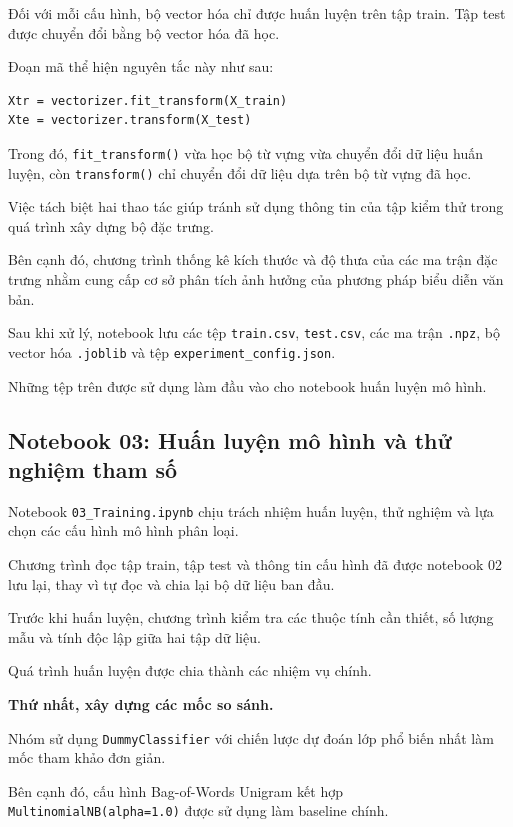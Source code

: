 Đối với mỗi cấu hình, bộ vector hóa chỉ được huấn luyện trên tập train. Tập test được chuyển đổi bằng bộ vector hóa đã học.

Đoạn mã thể hiện nguyên tắc này như sau:

\begin{verbatim}
Xtr = vectorizer.fit_transform(X_train)
Xte = vectorizer.transform(X_test)
\end{verbatim}

Trong đó, \texttt{fit\_transform()} vừa học bộ từ vựng vừa chuyển đổi dữ liệu huấn luyện, còn \texttt{transform()} chỉ chuyển đổi dữ liệu dựa trên bộ từ vựng đã học.

Việc tách biệt hai thao tác giúp tránh sử dụng thông tin của tập kiểm thử trong quá trình xây dựng bộ đặc trưng.

Bên cạnh đó, chương trình thống kê kích thước và độ thưa của các ma trận đặc trưng nhằm cung cấp cơ sở phân tích ảnh hưởng của phương pháp biểu diễn văn bản.

Sau khi xử lý, notebook lưu các tệp \texttt{train.csv}, \texttt{test.csv}, các ma trận \texttt{.npz}, bộ vector hóa \texttt{.joblib} và tệp \texttt{experiment\_config.json}.

Những tệp trên được sử dụng làm đầu vào cho notebook huấn luyện mô hình.


\subsection{Notebook 03: Huấn luyện mô hình và thử nghiệm tham số}

Notebook \texttt{03\_Training.ipynb} chịu trách nhiệm huấn luyện, thử nghiệm và lựa chọn các cấu hình mô hình phân loại.

Chương trình đọc tập train, tập test và thông tin cấu hình đã được notebook 02 lưu lại, thay vì tự đọc và chia lại bộ dữ liệu ban đầu.

Trước khi huấn luyện, chương trình kiểm tra các thuộc tính cần thiết, số lượng mẫu và tính độc lập giữa hai tập dữ liệu.

Quá trình huấn luyện được chia thành các nhiệm vụ chính.

\textbf{Thứ nhất, xây dựng các mốc so sánh.}

Nhóm sử dụng \texttt{DummyClassifier} với chiến lược dự đoán lớp phổ biến nhất làm mốc tham khảo đơn giản.

Bên cạnh đó, cấu hình Bag-of-Words Unigram kết hợp \texttt{MultinomialNB(alpha=1.0)} được sử dụng làm baseline chính.

